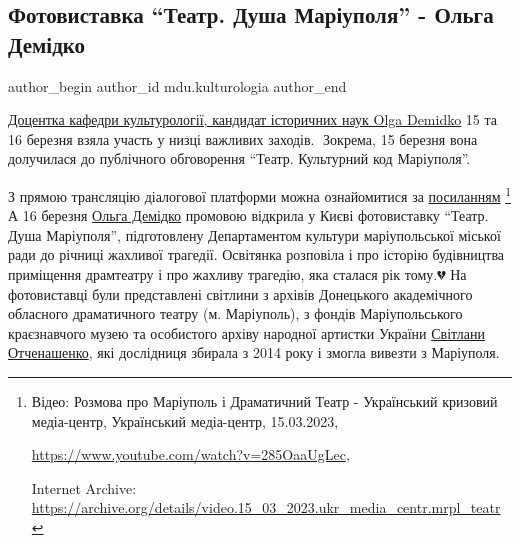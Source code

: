  
 
 
 
 

\subsection{Фотовиставка \enquote{Театр. Душа Маріуполя} - Ольга Демідко}
\label{sec:17_03_2023.fb.mdu.kulturologia.1.fotovystavka_teatr_dusha_mariupolja_olga_demidko}

\ifcmt
 author_begin
   author_id mdu.kulturologia
 author_end
\fi


\href{\urlDemidkoIA}{Доцентка кафедри культурології, кандидат історичних наук Olga Demidko} 15 та 16
березня взяла участь у низці важливих заходів.👏 Зокрема, 15 березня вона
долучилася до публічного обговорення \enquote{Театр. Культурний код Маріуполя}. 


З прямою трансляцію діалогової платформи можна ознайомитися за \href{https://archive.org/details/video.15_03_2023.ukr_media_centr.mrpl_teatr}{посиланням}%
\footnote{Відео: Розмова про Маріуполь і Драматичний Театр - Український кризовий медіа-центр, 
Український медіа-центр, 15.03.2023, \par%
\url{https://www.youtube.com/watch?v=285OaaUgLec}, \par%
Internet Archive: \url{https://archive.org/details/video.15_03_2023.ukr_media_centr.mrpl_teatr}%
} А 16 березня \href{\urlDemidkoIA}{Ольга Демідко} промовою відкрила у Києві фотовиставку \enquote{Театр. Душа Маріуполя},
підготовлену Департаментом культури маріупольської міської ради до річниці
жахливої трагедії. Освітянка розповіла і про історію будівництва приміщення
драмтеатру і про жахливу трагедію, яка сталася рік тому.💔 На фотовиставці були
представлені світлини з архівів Донецького академічного обласного драматичного
театру (м. Маріуполь), з фондів Маріупольського краєзнавчого музею та особистого
архіву народної артистки України \href{\urlSvitlanaIvanivnaOtchenashenkoIA}{Світлани Отченашенко}, які дослідниця збирала з
2014 року і змогла вивезти з Маріуполя.


